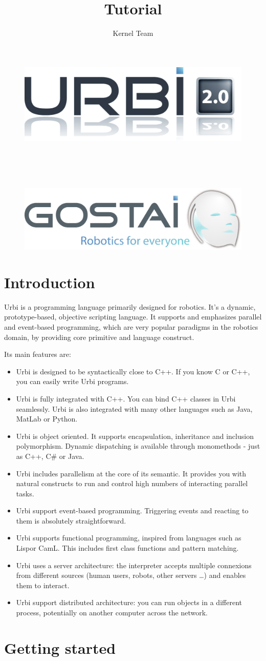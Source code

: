 \documentclass[openright,twoside,12pt]{report}
\title{Tutorial}
\author{Kernel Team}
\makeatletter
\newcommand{\C}{C\xspace}
\newcommand{\caml}{CamL\xspace}
\newcommand{\Cs}{C\#\xspace}
\newcommand{\Cxx}{C++\xspace}
\newcommand{\java}{Java\xspace}
\newcommand{\lisp}{Lisp}
\newcommand{\matlab}{MatLab\xspace}
\newcommand{\python}{Python\xspace}
\newcommand{\urbi}{Urbi\xspace}
\renewcommand{\maketitle}{
  \begin{titlepage}

    \vfill

    \begin{figure}[htp]
      \centering
      \includegraphics[width=12cm]{urbi-logo}
    \end{figure}

    \begin{center}
      {\Huge\bf\@title\\}
      \vspace{1cm}
      {\Large \@author\\}
      \vspace{1cm}
      {\large \@date\\}
    \end{center}

    \vfill

    \begin{figure}[htp]
      \centering
      \includegraphics[width=12cm]{gostai}
    \end{figure}

    \vfill
    \global\let\title\relax
  \end{titlepage}
}
\makeatother
\begin{document}
\maketitle

\chapter{Introduction}

Urbi is a programming language primarily designed for robotics. It's a
dynamic, prototype-based, objective scripting language. It supports
and emphasizes parallel and event-based programming, which are very
popular paradigms in the robotics domain, by providing core primitive
and language construct.

Its main features are:
\begin{itemize}
\item \urbi is designed to be syntactically close to \Cxx. If you know
  \C or \C++, you can easily write \urbi programs.
\item \urbi is fully integrated with \Cxx. You can bind \Cxx classes
  in \urbi seamlessly. \urbi is also integrated with many other
  languages such as \java, \matlab or \python.
\item \urbi is object oriented. It supports encapsulation, inheritance
  and inclusion polymorphism. Dynamic dispatching is available through
  monomethods - just as \Cxx, \Cs or \java.
\item \urbi includes parallelism at the core of its semantic. It
  provides you with natural constructs to run and control high numbers
  of interacting parallel tasks.
\item \urbi support event-based programming. Triggering events and
  reacting to them is absolutely straightforward.
\item \urbi supports functional programming, inspired from languages
  such as \lisp or \caml. This includes first class functions and
  pattern matching.
\item \urbi uses a server architecture: the interpreter accepts
  multiple connexions from different sources (human users, robots,
  other servers \ldots) and enables them to interact.
\item \urbi support distributed architecture: you can run objects in a
  different process, potentially on another computer across the
  network.
\end{itemize}

\chapter{Getting started}
\end{document}
